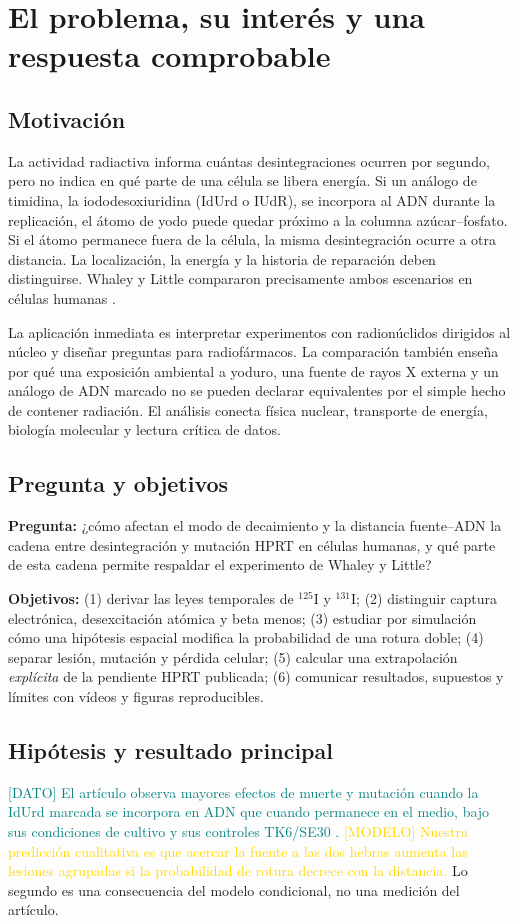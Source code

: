 \documentclass[11pt,a4paper]{article}
\newcommand{\dato}[1]{\textcolor{teal}{\textsf{[DATO] #1}}}
\newcommand{\hip}[1]{\textcolor{gold}{\textsf{[MODELO] #1}}}
\begin{document}
\section{El problema, su interés y una respuesta comprobable}
\subsection{Motivación}
La actividad radiactiva informa cuántas desintegraciones ocurren por segundo, pero no indica en qué parte de una célula se libera energía. Si un análogo de timidina, la iododesoxiuridina (IdUrd o IUdR), se incorpora al ADN durante la replicación, el átomo de yodo puede quedar próximo a la columna azúcar--fosfato. Si el átomo permanece fuera de la célula, la misma desintegración ocurre a otra distancia. La localización, la energía y la historia de reparación deben distinguirse. Whaley y Little compararon precisamente ambos escenarios en células humanas \cite{whaley}.

La aplicación inmediata es interpretar experimentos con radionúclidos dirigidos al núcleo y diseñar preguntas para radiofármacos. La comparación también enseña por qué una exposición ambiental a yoduro, una fuente de rayos X externa y un análogo de ADN marcado no se pueden declarar equivalentes por el simple hecho de contener radiación. El análisis conecta física nuclear, transporte de energía, biología molecular y lectura crítica de datos.

\subsection{Pregunta y objetivos}
\textbf{Pregunta:} ¿cómo afectan el modo de decaimiento y la distancia fuente--ADN la cadena entre desintegración y mutación HPRT en células humanas, y qué parte de esta cadena permite respaldar el experimento de Whaley y Little?

\textbf{Objetivos:} (1) derivar las leyes temporales de $^{125}$I y $^{131}$I; (2) distinguir captura electrónica, desexcitación atómica y beta menos; (3) estudiar por simulación cómo una hipótesis espacial modifica la probabilidad de una rotura doble; (4) separar lesión, mutación y pérdida celular; (5) calcular una extrapolación \emph{explícita} de la pendiente HPRT publicada; (6) comunicar resultados, supuestos y límites con vídeos y figuras reproducibles.

\subsection{Hipótesis y resultado principal}
\dato{El artículo observa mayores efectos de muerte y mutación cuando la IdUrd marcada se incorpora en ADN que cuando permanece en el medio, bajo sus condiciones de cultivo y sus controles TK6/SE30 \cite{whaley}.} \hip{Nuestra predicción cualitativa es que acercar la fuente a las dos hebras aumenta las lesiones agrupadas si la probabilidad de rotura decrece con la distancia.} Lo segundo es una consecuencia del modelo condicional, no una medición del artículo.
\end{document}
